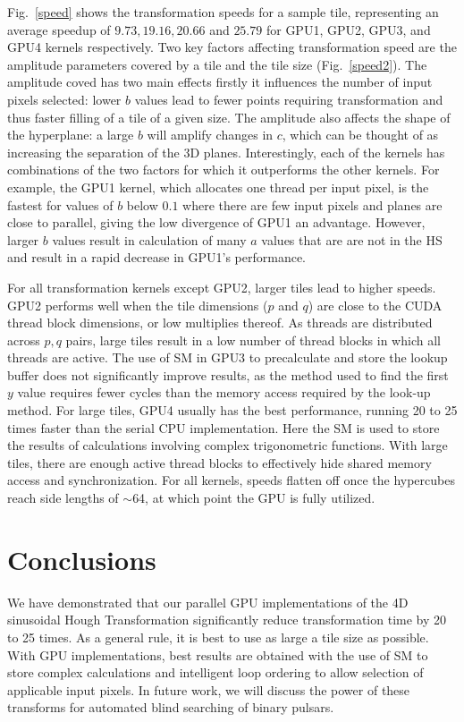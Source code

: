 Fig.~\ref{speed} shows the transformation speeds for a sample tile, representing an average speedup of $9.73, 19.16, 20.66$ and $25.79$ for GPU1, GPU2, GPU3, and GPU4  kernels respectively.
Two key factors affecting transformation speed are the amplitude parameters covered by a tile and the tile size (Fig.~\ref{speed2}).
The amplitude coved has two main effects firstly it influences the number of input pixels selected: lower $b$ values lead to fewer points requiring transformation and thus faster filling of a tile of a given size.
The amplitude also affects the shape of the hyperplane: a large $b$ will amplify changes in $c$, which can be thought of as increasing the separation of the 3D planes.
Interestingly, each of the kernels has combinations of the two factors for which it outperforms the other kernels.
For example, the GPU1 kernel, which allocates one thread per input pixel, is the fastest for values of $b$ below $0.1$ where there are few input pixels and planes are close to parallel, giving the low divergence of GPU1 an advantage.
However, larger $b$ values result in  calculation of many $a$ values that are are not in the HS and result in a rapid decrease in GPU1's performance.

For all transformation kernels except GPU2, larger tiles lead to higher speeds.
GPU2 performs well when the tile dimensions ($p$ and $q$) are close to the CUDA thread block dimensions, or low multiplies thereof.
As threads are distributed across $p,q$ pairs, large tiles result in a low number of thread blocks in which all threads are active.
The use of SM in GPU3 to precalculate and store the lookup buffer does not significantly improve results, as the method used to find the first $y$ value requires fewer cycles than the memory access required by the look-up method.
For large tiles, GPU4 usually has the best performance, running  20 to 25 times faster than the serial CPU implementation.
Here the SM is used to store the results of calculations involving complex trigonometric functions.
With large tiles, there are enough active thread blocks to effectively hide shared memory access and synchronization.
For all kernels, speeds flatten off once the hypercubes reach side lengths of $\sim$64, at which point the GPU is fully utilized.

\section{Conclusions}
\label{Conclusion}

We have demonstrated that our parallel GPU implementations of the 4D sinusoidal Hough Transformation significantly reduce transformation time by 20 to 25 times.
As a general rule, it is best to use as large a tile size as possible.
With GPU implementations, best results are obtained with the use of SM to store complex calculations and intelligent loop ordering to allow selection of applicable input pixels.
In future work, we will discuss the power of these transforms for automated blind searching of binary pulsars.  


